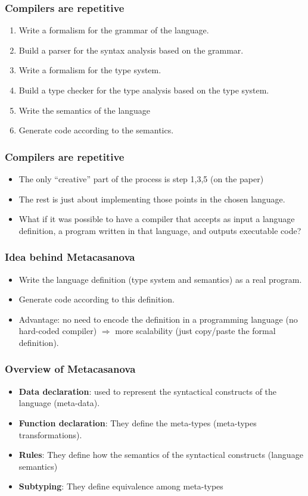 \documentclass[10pt,a4paper]{beamer}
\begin{document}
\begin{frame}
	\frametitle{Compilers are repetitive}
	\begin{enumerate}
		\item Write a formalism for the grammar of the language.
		\item Build a parser for the syntax analysis based on the grammar.
		\item Write a formalism for the type system.
		\item Build a type checker for the type analysis based on the type system.
		\item Write the semantics of the language
		\item Generate code according to the semantics.
	\end{enumerate}
\end{frame}

\begin{frame}
	\frametitle{Compilers are repetitive}
	\begin{itemize}
		\item The only ``creative'' part of the process is step 1,3,5 (on the paper)
		\item The rest is just about implementing those points in the chosen language.
		\item What if it was possible to have a compiler that accepts as input a language definition, a program written in that language, and outputs executable code?
	\end{itemize}
\end{frame}

\begin{frame}
	\frametitle{Idea behind Metacasanova}
	\begin{itemize}
		\item Write the language definition (type system and semantics) as a real program.
		\item Generate code according to this definition.
		\item Advantage: no need to encode the definition in a programming language (no hard-coded compiler) $\Rightarrow$ more scalability (just copy/paste the formal definition).
	\end{itemize}
\end{frame}

\begin{frame}
	\frametitle{Overview of Metacasanova}
	\begin{itemize}
		\item \textbf{Data declaration}: used to represent the syntactical constructs of the language (meta-data).
		\item \textbf{Function declaration}: They define the meta-types (meta-types transformations).
		\item \textbf{Rules}: They define how the semantics of the syntactical constructs (language semantics)
		\item \textbf{Subtyping}: They define equivalence among meta-types
	\end{itemize}
\end{frame}
\end{document}
